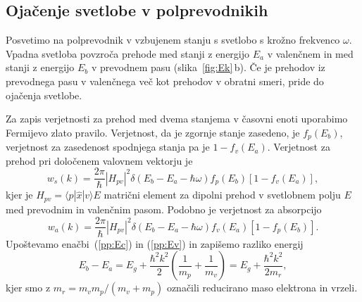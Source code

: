 \subsection*{Ojačenje svetlobe v polprevodnikih}
Posvetimo na polprevodnik v vzbujenem stanju s svetlobo s krožno frekvenco $\omega$.
Vpadna svetloba povzroča prehode med stanji z energijo $E_a$ v valenčnem 
in med stanji z energijo $E_b$ v prevodnem pasu (slika~\ref{fig:Ek}\,b).
Če je prehodov iz prevodnega pasu v valenčnega več kot prehodov v obratni
smeri, pride do ojačenja svetlobe. 

Za zapis verjetnosti za prehod med dvema stanjema v časovni
enoti uporabimo Fermijevo zlato pravilo. Verjetnost, da je zgornje stanje zasedeno, je 
$f_p(E_b)$, verjetnost za zasedenost spodnjega stanja pa je $1-f_v(E_a)$. Verjetnost 
za prehod pri določenem valovnem vektorju je
\begin{equation}  
w_s(k)=\frac{2\pi}{\hbar}|H_{pv}|^2\delta(E_b-E_a- \hbar\omega)
f_p(E_b)[1-f_v(E_a)],
\label{6.5}
\end{equation}
kjer je $H_{pv}= \langle p| \hat{x}|v\rangle E $ matrični element za dipolni
prehod v svetlobnem polju $E$ med prevodnim in valenčnim pasom. Podobno je
verjetnost za absorpcijo 
\begin{equation}  
w_a(k)=\frac{2\pi}{\hbar}|H_{pv}|^2\delta(E_b-E_a- \hbar\omega)
f_v(E_a)[1-f_p(E_b)].
\label{6.6}
\end{equation}
Upoštevamo enačbi~(\ref{pp:Ec}) in (\ref{pp:Ev}) in zapišemo razliko energij
\begin{equation}  
E_b-E_a= E_g + \frac{\hbar^2 k^2}{2}(\frac{1}{m_p}+ \frac{1}{m_v})= E_g + \frac{\hbar^2 k^2}{2m_r},
\label{6.8}
\end{equation}
kjer smo z $m_r=m_v m_p/(m_v+m_p)$ označili reducirano maso elektrona in vrzeli.

